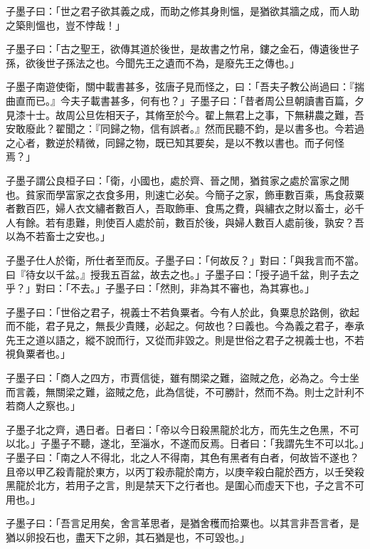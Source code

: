 \begin{pinyinscope}
子墨子曰：「世之君子欲其義之成，而助之修其身則慍，是猶欲其牆之成，而人助之築則慍也，豈不悖哉！」

子墨子曰：「古之聖王，欲傳其道於後世，是故書之竹帛，鏤之金石，傳遺後世子孫，欲後世子孫法之也。今聞先王之遺而不為，是廢先王之傳也。」

子墨子南遊使衛，關中載書甚多，弦唐子見而怪之，曰：「吾夫子教公尚過曰：『揣曲直而已。』今夫子載書甚多，何有也？」子墨子曰：「昔者周公旦朝讀書百篇，夕見漆十士。故周公旦佐相天子，其脩至於今。翟上無君上之事，下無耕農之難，吾安敢廢此？翟聞之：『同歸之物，信有誤者。』然而民聽不鈞，是以書多也。今若過之心者，數逆於精微，同歸之物，既已知其要矣，是以不教以書也。而子何怪焉？」

子墨子謂公良桓子曰：「衛，小國也，處於齊、晉之閒，猶貧家之處於富家之閒也。貧家而學富家之衣食多用，則速亡必矣。今簡子之家，飾車數百乘，馬食菽粟者數百匹，婦人衣文繡者數百人，吾取飾車、食馬之費，與繡衣之財以畜士，必千人有餘。若有患難，則使百人處於前，數百於後，與婦人數百人處前後，孰安？吾以為不若畜士之安也。」

子墨子仕人於衛，所仕者至而反。子墨子曰：「何故反？」對曰：「與我言而不當。曰『待女以千盆。』授我五百盆，故去之也。」子墨子曰：「授子過千盆，則子去之乎？」對曰：「不去。」子墨子曰：「然則，非為其不審也，為其寡也。」

子墨子曰：「世俗之君子，視義士不若負粟者。今有人於此，負粟息於路側，欲起而不能，君子見之，無長少貴賤，必起之。何故也？曰義也。今為義之君子，奉承先王之道以語之，縱不說而行，又從而非毀之。則是世俗之君子之視義士也，不若視負粟者也。」

子墨子曰：「商人之四方，市賈信徙，雖有關梁之難，盜賊之危，必為之。今士坐而言義，無關梁之難，盜賊之危，此為信徙，不可勝計，然而不為。則士之計利不若商人之察也。」

子墨子北之齊，遇日者。日者曰：「帝以今日殺黑龍於北方，而先生之色黑，不可以北。」子墨子不聽，遂北，至淄水，不遂而反焉。日者曰：「我謂先生不可以北。」子墨子曰：「南之人不得北，北之人不得南，其色有黑者有白者，何故皆不遂也？且帝以甲乙殺青龍於東方，以丙丁殺赤龍於南方，以庚辛殺白龍於西方，以壬癸殺黑龍於北方，若用子之言，則是禁天下之行者也。是圍心而虛天下也，子之言不可用也。」

子墨子曰：「吾言足用矣，舍言革思者，是猶舍穫而拾粟也。以其言非吾言者，是猶以卵投石也，盡天下之卵，其石猶是也，不可毀也。」


\end{pinyinscope}